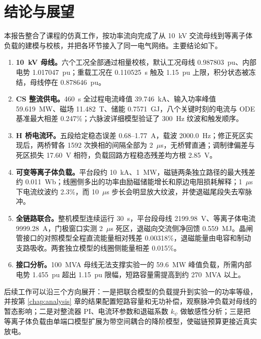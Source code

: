 
\chapter{结论与展望}
\label{chap:conclusion}

本报告整合了课程的仿真工作，按功率流向完成了从 10~kV 交流母线到等离子体负载的建模与校核，并把各环节接入了同一电气网络。主要结论如下。

\begin{enumerate}
  \item \textbf{10~kV 母线。}六个工况全部通过相量校核，默认工况母线 0.987803~pu、内部电势 1.017047~pu；重载工况在 0.110525~s 触及 1.15~pu 上限，积分状态被冻结，母线停在 0.878646~pu。
  \item \textbf{CS 整流供电。}460~s 全过程电流峰值 39.746~kA、输入功率峰值 59.619~MW、磁场 11.482~T、储能 0.7571~GJ，八个关键时刻的电流与 ODE 基准最大相差 0.247\%；六脉波详细模型验证了 300~Hz 纹波和触发顺序。
  \item \textbf{H 桥电流环。}五段给定稳态误差 0.68--1.77~A，载波 2000.0~Hz；修正死区实现后，两桥臂各 1592 次换相的间隔全部为 2~$\mu$s，无桥臂直通；调制律偏差与死区损失 17.60~V 相符，负载回路方程稳态残差均方根 2.85~V。
  \item \textbf{可变等离子体负载。}平台段约 10~kA、1~MW，磁链两条独立路径的最大残差约 0.011~Wb；线圈侧多出的功率由励磁储能增长和原边电阻损耗解释；1~$\mu$s 下电流纹波约 2.3\%，而 10~$\mu$s 步长会明显放大纹波，并使退磁尾段失去窄脉冲。
  \item \textbf{全链路联合。}整机模型连续运行 30~s，平台段母线 2199.98~V、等离子体电流 9999.28~A，门极窗口实测 2~$\mu$s 死区，退磁向交流侧净回馈 0.559~MJ。晶闸管接口的对照模型全程直流能量相对残差 0.00318\%，退磁能量由电容和制动支路吸收。两套独立模型的线圈侧能量相差 0.015\%。
  \item \textbf{接口分析。}100~MVA 母线无法支撑实验一的 59.6~MW 峰值负载，所需内部电势 1.455~pu 超出 1.15~pu 限幅，短路容量需提高到约 270~MVA 以上。
\end{enumerate}

后续工作可以沿三个方向展开：一是把联合模型的负载提升到实验一的功率等级，并按第 \ref{chap:analysis} 章的结果配置短路容量和无功补偿，观察脉冲负载对母线的暂态影响；二是对整流器 PI、电流环参数和退磁系数 $k_\psi$ 做敏感性分析；三是把等离子体负载由单端口模型扩展为带空间耦合的降阶模型，使磁链预算更接近真实放电。
